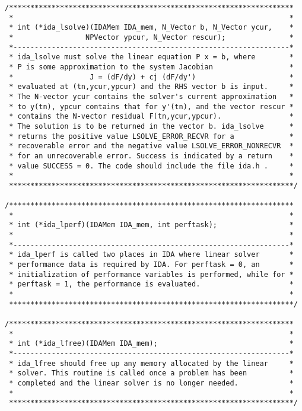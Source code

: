 \begin{verbatim}
/*******************************************************************
 *                                                                 *
 * int (*ida_lsolve)(IDAMem IDA_mem, N_Vector b, N_Vector ycur,    *
 *                 NPVector ypcur, N_Vector rescur);               *
 *-----------------------------------------------------------------*
 * ida_lsolve must solve the linear equation P x = b, where        *
 * P is some approximation to the system Jacobian                  *
 *                  J = (dF/dy) + cj (dF/dy')                      *
 * evaluated at (tn,ycur,ypcur) and the RHS vector b is input.     *
 * The N-vector ycur contains the solver's current approximation   *
 * to y(tn), ypcur contains that for y'(tn), and the vector rescur *
 * contains the N-vector residual F(tn,ycur,ypcur).                *
 * The solution is to be returned in the vector b. ida_lsolve      *
 * returns the positive value LSOLVE_ERROR_RECVR for a             *
 * recoverable error and the negative value LSOLVE_ERROR_NONRECVR  *
 * for an unrecoverable error. Success is indicated by a return    *
 * value SUCCESS = 0. The code should include the file ida.h .     *
 *                                                                 *
 *******************************************************************/

/*******************************************************************
 *                                                                 *
 * int (*ida_lperf)(IDAMem IDA_mem, int perftask);                 *
 *                                                                 *
 *-----------------------------------------------------------------*
 * ida_lperf is called two places in IDA where linear solver       *
 * performance data is required by IDA. For perftask = 0, an       *
 * initialization of performance variables is performed, while for *
 * perftask = 1, the performance is evaluated.                     *
 *                                                                 *
 *******************************************************************/

/*******************************************************************
 *                                                                 *
 * int (*ida_lfree)(IDAMem IDA_mem);                               *
 *-----------------------------------------------------------------*
 * ida_lfree should free up any memory allocated by the linear     *
 * solver. This routine is called once a problem has been          *
 * completed and the linear solver is no longer needed.            *
 *                                                                 *
 *******************************************************************/

\end{verbatim}
\normalsize


